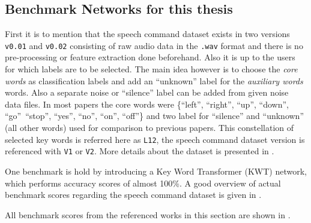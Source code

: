 \subsection{Benchmark Networks for this thesis}\label{sec:prev_kws_benchmark}
First it is to mention that the speech command dataset \cite{Warden2018} exists in two versions \texttt{v0.01} and \texttt{v0.02} consisting of raw audio data in the \texttt{.wav} format and there is no pre-processing or feature extraction done beforehand.
Also it is up to the users for which labels are to be selected.
The main idea however is to choose the \emph{core words} as classification labels and add an \enquote{unknown} label for the \emph{auxiliary words} words.
Also a separate noise or \enquote{silence} label can be added from given noise data files.
In most papers the core words were \{\enquote{left},  \enquote{right}, \enquote{up}, \enquote{down}, \enquote{go}\, \enquote{stop}, \enquote{yes}, \enquote{no}, \enquote{on}, \enquote{off}\} and two label for \enquote{silence} and \enquote{unknown} (all other words) used for comparison to previous papers.
This constellation of selected key words is referred here as \texttt{L12}, the speech command dataset version is referenced with \texttt{V1} or \texttt{V2}.
More details about the dataset is presented in .

One benchmark is hold by \cite{Berg2021} introducing a Key Word Transformer (KWT) network, which performs accuracy scores of almost 100\%.
A good overview of actual benchmark scores regarding the speech command dataset is given in \cite{PaperswithcodeKWS}.

All benchmark scores from the referenced works in this section are shown in .


